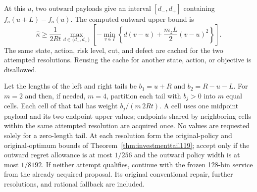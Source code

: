 At this $u$, two outward payloads give an interval $[d_-,d_+]$
containing $f_a(u+L)-f_a(u)$.  The computed outward upper bound is
\begin{equation}\label{eq:budgetedkappa119}
 \widehat\kappa\ge
 \frac{1}{2Rt}\max_{d\in\{d_-,d_+\}}
 \left[-\min_{v\in I}
       \left\{d(v-u)+\frac{m_zL}{2}(v-u)^2\right\}\right].
\end{equation}
The same state, action, risk level, cut, and defect are cached for the
two attempted resolutions.  Reusing the cache for another state,
action, or objective is disallowed.

Let the lengths of the left and right tails be
$b_1=u+R$ and $b_2=R-u-L$.  For $m=2$ and then, if needed, $m=4$,
partition each tail with $b_j>0$ into $m$ equal cells.  Each cell of
that tail has weight $b_j/(m\,2Rt)$.  A cell uses one midpoint
payload and its two endpoint upper values; endpoints shared by
neighboring cells within the same attempted resolution are acquired
once.  No values are requested solely for a zero-length tail.  At
each resolution form the original-policy and original-optimum bounds
of Theorem~\ref{thm:investmenttail119}; accept only if the outward
regret allowance is at most $1/256$ and the outward policy width is
at most $1/8192$.  If neither attempt qualifies, continue with the
frozen 128-bin service from the already acquired proposal.  Its
original conventional repair, further resolutions, and rational
fallback are included.

